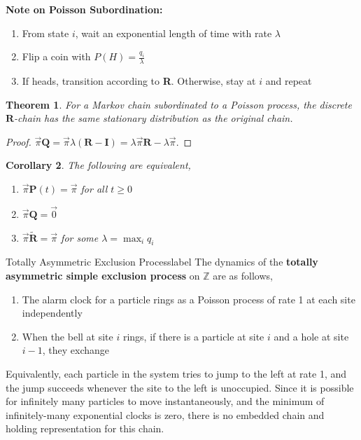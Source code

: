 \documentclass{tufte-handout}
\newtheorem{thm}{Theorem}
\newtheorem{cor}[thm]{Corollary}
\begin{document}
  \begin{marginfigure}
    \textbf{Note on Poisson Subordination: }
    \begin{enumerate}
      \item From state $i$, wait an exponential length of time with rate $\lambda$
      \item Flip a coin with $P(H) = \frac{q_i}{\lambda}$
      \item If heads, transition according to \textbf{R}. Otherwise, stay at $i$ and repeat
    \end{enumerate}
  \end{marginfigure}

\begin{thm}
  For a Markov chain subordinated to a Poisson process, the discrete $\mathbf{R}$-chain has the same stationary distribution as the original chain.
\end{thm}

\begin{proof}
  $\Vec{\pi} \mathbf{Q} =\Vec{\pi} \lambda(\boldsymbol{R}-\boldsymbol{I})=\lambda \Vec{\pi} \boldsymbol{R}-\lambda \Vec{\pi}$.
\end{proof}

\begin{cor}
  The following are equivalent,
  \begin{enumerate}
    \item $\Vec{\pi} \boldsymbol{P}(t) = \Vec{\pi}$ for all $t \geq 0$
    \item $\Vec{\pi} \boldsymbol{Q} = \Vec{0}$
    \item $\Vec{\pi} \tilde{\boldsymbol{R}} = \Vec{\pi}$ for some $\lambda = \max_i q_i$
  \end{enumerate}
\end{cor}

\begin{ex}{Totally Asymmetric Exclusion Process}{label}
  The dynamics of the \textbf{totally asymmetric simple exclusion process} on $\mathbb{Z}$ are as follows,
  \begin{enumerate}
    \item The alarm clock for a particle rings as a Poisson process of rate 1 at each site independently
    \item When the bell at site $i$ rings, if there is a particle at site $i$ and a hole at site $i - 1$, they exchange
  \end{enumerate}
  Equivalently, each particle in the system tries to jump to the left at rate 1, and the jump succeeds whenever the site to the left is unoccupied. Since it is possible for infinitely many particles to move instantaneously, and the minimum of infinitely-many exponential clocks is zero, there is no embedded chain and holding representation for this chain.
\end{ex}
\end{document}
